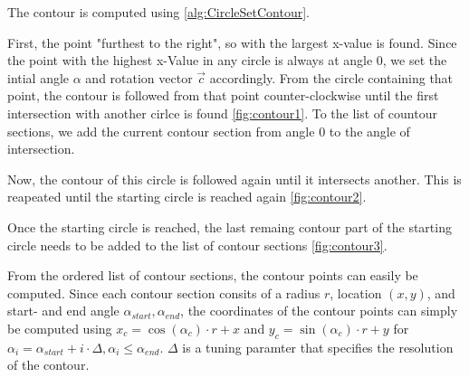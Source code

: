 The contour is computed using \ref{alg:CircleSetContour}.

First, the point "furthest to the right", so with the largest x-value is found. 
Since the point with the highest x-Value in any circle is always at angle 0, we set the intial angle $\alpha$ and rotation vector $\vec{c}$ accordingly.
From the circle containing that point, the contour is followed from that point counter-clockwise until the first intersection with another cirlce is found \ref{fig:contour1}.
To the list of countour sections, we add the current contour section from angle 0 to the angle of intersection.

Now, the contour of this circle is followed again until it intersects another. This is reapeated until the starting circle is reached again \ref{fig:contour2}.

Once the starting circle is reached, the last remaing contour part of the starting circle needs to be added to the list of contour sections \ref{fig:contour3}.

From the ordered list of contour sections, the contour points can easily be computed.
Since each contour section consits of a radius $r$, location $(x,y)$, and start- and end angle $\alpha_{start}, \alpha_{end}$, the coordinates of the contour points can simply be computed using $x_c = \cos(\alpha_c) \cdot r + x$ and  $y_c = \sin(\alpha_c) \cdot r + y$ 
for $\alpha_i = \alpha_{start} + i \cdot \Delta, \alpha_i \leq \alpha_{end}$.
$\Delta$ is a tuning paramter that specifies the resolution of the contour.



